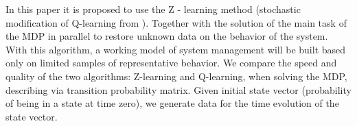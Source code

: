 \documentclass[12pt,twoside]{article}
\begin{document}
In this paper it is proposed to use the Z - learning method (stochastic modification of Q-learning from \cite{Szepesvari,Allen}). Together with the solution of the main task of the MDP in parallel to restore unknown data on the behavior of the system. With this algorithm, a working model of system management will be built based only on limited samples of representative behavior. We compare the speed and quality of the two algorithms: Z-learning and Q-learning, when solving the MDP, describing via transition probability matrix. Given initial state vector (probability of being in a state at time zero), we generate data for the time evolution of the state vector. 





\end{document}
